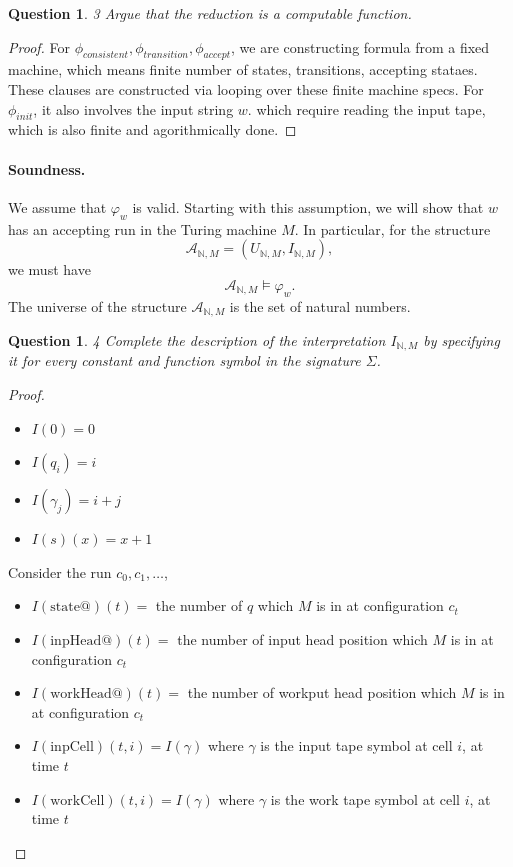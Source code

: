 \documentclass{article}
\newtheorem{question}[theorem]{Question}
\begin{document}
\begin{question}{3}
Argue that the reduction is a computable function.
\end{question}
\begin{proof}
    For $\phi_{consistent}, \phi_{transition}, \phi_{accept}$, we are constructing formula from a fixed machine, which means finite number of states, transitions, accepting stataes. These clauses are constructed via looping over these finite machine specs. 
    For $\phi_{init}$, it also involves the input string $w$. which require reading the input tape, which is also finite and agorithmically done.
\end{proof}
\paragraph{Soundness.}
We assume that $\varphi_w$ is valid. Starting with this assumption, we will show that $w$ has an accepting run in the Turing machine $M$. In particular, for the structure
\[
\mathcal{A}_{\mathbb{N},M}=(U_{\mathbb{N},M},I_{\mathbb{N},M}),
\]
we must have
\[
\mathcal{A}_{\mathbb{N},M}\models \varphi_w.
\]
The universe of the structure $\mathcal{A}_{\mathbb{N},M}$ is the set of natural numbers.

\begin{question}{4}
Complete the description of the interpretation $I_{\mathbb{N},M}$ by specifying it for every constant and function symbol in the signature $\Sigma$.
\end{question}
\begin{proof}
    \begin{itemize}
        \item $I(0) = 0$
        \item $I(q_i) = i$
        \item $I(\gamma_j) = i + j$ 
        \item $I(s)(x) = x + 1$
    \end{itemize}
    Consider the run $c_0, c_1, \dots$, 
    \begin{itemize}
        \item $I(\mathrm{state@})(t) = $ the number of $q$ which $M$ is in at configuration $c_t$
        \item $I(\mathrm{inpHead@})(t) = $ the number of input head position which $M$ is in at configuration $c_t$
        \item $I(\mathrm{workHead@})(t) = $ the number of workput head position which $M$ is in at configuration $c_t$
        \item $I(\mathrm{inpCell})(t, i) = I(\gamma)$ where $\gamma$ is the input tape symbol at cell $i$, at time $t$
        \item $I(\mathrm{workCell})(t, i) = I(\gamma)$ where $\gamma$ is the work tape symbol at cell $i$, at time $t$
    \end{itemize}
\end{proof}
\end{document}
